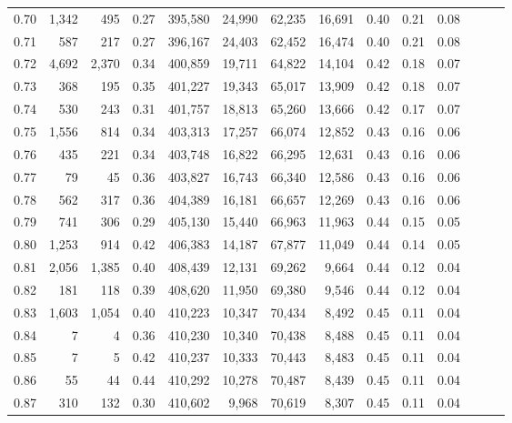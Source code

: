 \begin{tabular}{rrrrrrrrrrrrrr}
0.70 &   1,342 &    495 &  0.27 &  395,580 &   24,990 &  62,235 &  16,691 &  0.40 &  0.21 &      0.08 \\
0.71 &     587 &    217 &  0.27 &  396,167 &   24,403 &  62,452 &  16,474 &  0.40 &  0.21 &      0.08 \\
0.72 &   4,692 &  2,370 &  0.34 &  400,859 &   19,711 &  64,822 &  14,104 &  0.42 &  0.18 &      0.07 \\
0.73 &     368 &    195 &  0.35 &  401,227 &   19,343 &  65,017 &  13,909 &  0.42 &  0.18 &      0.07 \\
0.74 &     530 &    243 &  0.31 &  401,757 &   18,813 &  65,260 &  13,666 &  0.42 &  0.17 &      0.07 \\
0.75 &   1,556 &    814 &  0.34 &  403,313 &   17,257 &  66,074 &  12,852 &  0.43 &  0.16 &      0.06 \\
0.76 &     435 &    221 &  0.34 &  403,748 &   16,822 &  66,295 &  12,631 &  0.43 &  0.16 &      0.06 \\
0.77 &      79 &     45 &  0.36 &  403,827 &   16,743 &  66,340 &  12,586 &  0.43 &  0.16 &      0.06 \\
0.78 &     562 &    317 &  0.36 &  404,389 &   16,181 &  66,657 &  12,269 &  0.43 &  0.16 &      0.06 \\
0.79 &     741 &    306 &  0.29 &  405,130 &   15,440 &  66,963 &  11,963 &  0.44 &  0.15 &      0.05 \\
0.80 &   1,253 &    914 &  0.42 &  406,383 &   14,187 &  67,877 &  11,049 &  0.44 &  0.14 &      0.05 \\
0.81 &   2,056 &  1,385 &  0.40 &  408,439 &   12,131 &  69,262 &   9,664 &  0.44 &  0.12 &      0.04 \\
0.82 &     181 &    118 &  0.39 &  408,620 &   11,950 &  69,380 &   9,546 &  0.44 &  0.12 &      0.04 \\
0.83 &   1,603 &  1,054 &  0.40 &  410,223 &   10,347 &  70,434 &   8,492 &  0.45 &  0.11 &      0.04 \\
0.84 &       7 &      4 &  0.36 &  410,230 &   10,340 &  70,438 &   8,488 &  0.45 &  0.11 &      0.04 \\
0.85 &       7 &      5 &  0.42 &  410,237 &   10,333 &  70,443 &   8,483 &  0.45 &  0.11 &      0.04 \\
0.86 &      55 &     44 &  0.44 &  410,292 &   10,278 &  70,487 &   8,439 &  0.45 &  0.11 &      0.04 \\
0.87 &     310 &    132 &  0.30 &  410,602 &    9,968 &  70,619 &   8,307 &  0.45 &  0.11 &      0.04 \\

\end{tabular}
